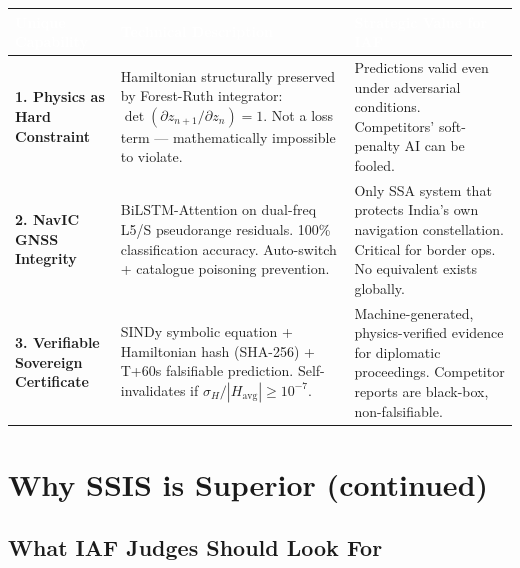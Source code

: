 \documentclass[11pt,a4paper]{article}
\newcommand{\TH}[1]{\textcolor{white}{\textbf{#1}}}
\renewcommand{\arraystretch}{1.35}
\begin{document}
\begin{landscape}
\begin{table}[H]
\centering
\renewcommand{\arraystretch}{1.5}
\begin{tabular}{|p{4.8cm}|p{9cm}|p{6.5cm}|}
\hline
\rowcolor{dblue}\TH{Unique Capability} & \TH{Technical Description} & \TH{Strategic Value for IAF} \\
\hline
\textcolor{dgreen}{\textbf{1. Physics as Hard Constraint}} &
Hamiltonian structurally preserved by Forest-Ruth integrator: $\det(\partial z_{n+1}/\partial z_n)=1$. Not a loss term --- mathematically impossible to violate. &
Predictions valid even under adversarial conditions. Competitors' soft-penalty AI can be fooled. \\
\hline
\textcolor{dgreen}{\textbf{2. NavIC GNSS Integrity}} &
BiLSTM-Attention on dual-freq L5/S pseudorange residuals. 100\% classification accuracy. Auto-switch + catalogue poisoning prevention. &
Only SSA system that protects India's own navigation constellation. Critical for border ops. No equivalent exists globally. \\
\hline
\textcolor{dgreen}{\textbf{3. Verifiable Sovereign Certificate}} &
SINDy symbolic equation + Hamiltonian hash (SHA-256) + T+60s falsifiable prediction. Self-invalidates if $\sigma_H/|H_\text{avg}|\ge10^{-7}$. &
Machine-generated, physics-verified evidence for diplomatic proceedings. Competitor reports are black-box, non-falsifiable. \\
\hline
\end{tabular}
\end{table}

\end{landscape}

\newpage
\section{Why SSIS is Superior (continued)}

\subsection{What IAF Judges Should Look For}
\end{document}

